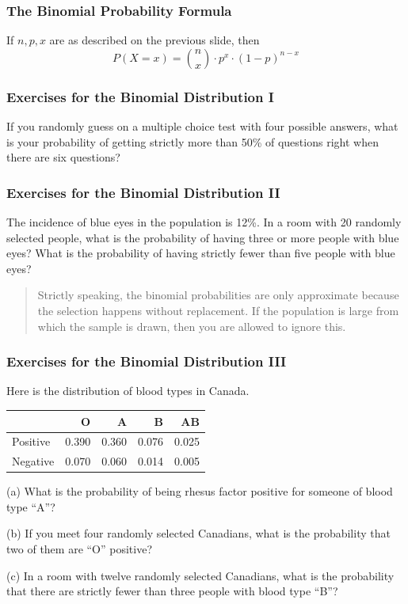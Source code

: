 \documentclass[xcolor=dvipsnames]{beamer}
\begin{document}
\begin{frame}
  \frametitle{The Binomial Probability Formula}
If $n,p,x$ are as described on the previous slide, then
\begin{equation}
  \label{eq:pheehael}
  P(X=x)=\binom{n}{x}\cdot{}p^{x}\cdot(1-p)^{n-x}
\end{equation}
\end{frame}

\begin{frame}
  \frametitle{Exercises for the Binomial Distribution I}
  {\ubung} If you randomly guess on a multiple choice test with four
  possible answers, what is your probability of getting strictly more than 50\%
  of questions right when there are six questions?
\end{frame}

\begin{frame}
  \frametitle{Exercises for the Binomial Distribution II}
  {\ubung} The incidence of blue eyes in the population is 12\%. In a room
  with 20 randomly selected people, what is the probability of having
  three or more people with blue eyes? What is the probability of
  having strictly fewer than five people with blue eyes? 
  \begin{quote}
    Strictly speaking, the binomial probabilities are only approximate
    because the selection happens without replacement. If the
    population is large from which the sample is drawn, then you are
    allowed to ignore this.
  \end{quote}
\end{frame}

\begin{frame}
  \frametitle{Exercises for the Binomial Distribution III}
  {\ubung} Here is the distribution of blood types in Canada.

\bigskip

  \begin{tabular}{|l|r|r|r|r|}\hline
         & O     & A     & B     & AB    \\ \hline
Positive & 0.390 & 0.360 & 0.076 & 0.025 \\ \hline
Negative & 0.070 & 0.060 & 0.014 & 0.005 \\ \hline
  \end{tabular}

\bigskip

(a) What is the probability of being rhesus factor positive for
someone of blood type ``A''?

\medskip

(b) If you meet four randomly selected Canadians, what is the
probability that two of them are ``O'' positive?

\medskip

(c) In a room with twelve randomly selected Canadians, what is the
probability that there are strictly fewer than three people with
blood type ``B''?
\end{frame}
\end{document}
